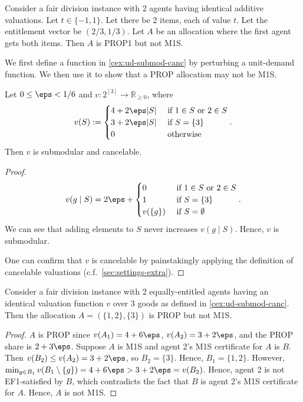 \begin{example}
\label{cex:prop1-not-m1s-n2}
Consider a fair division instance with 2 agents having identical additive valuations.
Let $t \in \{-1, 1\}$. Let there be 2 items, each of value $t$.
Let the entitlement vector be $(2/3, 1/3)$.
Let $A$ be an allocation where the first agent gets both items.
Then $A$ is PROP1 but not M1S.
\end{example}

We first define a function in \cref{cex:ud-submod-canc} by perturbing a unit-demand function.
We then use it to show that a PROP allocation may not be M1S.

\begin{lemma}
\label{cex:ud-submod-canc}
Let $0 \le \eps < 1/6$ and $v: 2^{[3]} \to \mathbb{R}_{\ge 0}$, where
\[ v(S) := \begin{cases}
4 + 2\eps|S| & \textrm{ if } 1 \in S \textrm{ or } 2 \in S
\\ 3 + 2\eps|S| & \textrm{ if } S = \{3\}
\\ 0 & \textrm{ otherwise}
\end{cases}. \]
Then $v$ is submodular and cancelable.
\end{lemma}
\begin{proof}
\[ v(g \mid S) = 2\eps + \begin{cases}
0 & \textrm{ if } 1 \in S \textrm{ or } 2 \in S
\\ 1 & \textrm{ if } S = \{3\}
\\ v(\{g\}) & \textrm{ if } S = \emptyset
\end{cases}. \]
We can see that adding elements to $S$ never increases $v(g \mid S)$.
Hence, $v$ is submodular.

One can confirm that $v$ is cancelable by painstakingly applying the definition of cancelable valuations
(c.f.~\cref{sec:settings-extra}).
\end{proof}

\begin{lemma}
\label{cex:prop-not-m1s-submod}
Consider a fair division instance with 2 equally-entitled agents
having an identical valuation function $v$ over 3 goods as defined in \cref{cex:ud-submod-canc}.
Then the allocation $A = (\{1, 2\}, \{3\})$ is PROP but not M1S.
\end{lemma}
\begin{proof}
$A$ is PROP since $v(A_1) = 4+6\eps$, $v(A_2) = 3+2\eps$, and the PROP share is $2+3\eps$.
Suppose $A$ is M1S and agent 2's M1S certificate for $A$ is $B$.
Then $v(B_2) \le v(A_2) = 3 + 2\eps$, so $B_2 = \{3\}$. Hence, $B_1 = \{1, 2\}$.
However, $\min_{g \in B_1} v(B_1 \setminus \{g\}) = 4 + 6\eps > 3 + 2\eps = v(B_2)$.
Hence, agent 2 is not EF1-satisfied by $B$, which contradicts the fact that $B$
is agent 2's M1S certificate for $A$. Hence, $A$ is not M1S.
\end{proof}
